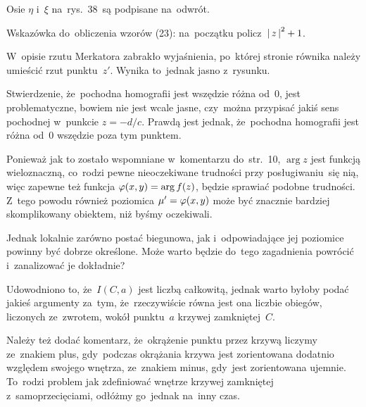 \documentclass[a4paper,11pt]{article}
\begin{document}
\vspace{\spaceFour}


\start {} Osie $\eta$ i~$\xi$ na~rys.~38~są podpisane na~odwrót.

\vspace{\spaceFour}


\start {} Wskazówka do~obliczenia wzorów (23): na~początku
policz~$\left| \,  z  \, \right|^{ 2 } + 1$.

\vspace{\spaceFour}


\start {} W~opisie rzutu Merkatora zabrakło wyjaśnienia,
po~której stronie równika należy umieścić rzut punktu~$z'$. Wynika
to~jednak jasno z~rysunku.

\vspace{\spaceFour}


\start {} Stwierdzenie, że~pochodna homografii jest wszędzie
różna od~0, jest problematyczne, bowiem nie jest wcale jasne,
czy~można przypisać jakiś sens pochodnej w~punkcie $z = -d / c$.
Prawdą jest jednak, że~pochodna homografii jest różna od~0 wszędzie
poza tym punktem.

\vspace{\spaceFour}


\start {} Ponieważ jak to zostało wspomniane w~komentarzu
do~str.~10, $\arg z$ jest funkcją wieloznaczną, co~rodzi pewne
nieoczekiwane trudności przy posługiwaniu~się nią, więc zapewne też
funkcja $\varphi( x, y ) = \arg f( z )$, będzie sprawiać podobne
trudności. Z~tego powodu również poziomica $\mu' = \varphi( x, y )$ może
być znacznie bardziej skomplikowany obiektem, niż byśmy oczekiwali.

Jednak lokalnie zarówno postać biegunowa, jak i~odpowiadające jej
poziomice powinny być dobrze określone. Może warto będzie do~tego
zagadnienia powrócić i~zanalizować je dokładnie?

\vspace{\spaceFour}


\start {} Udowodniono to, że~$I( C, a )$ jest liczbą
całkowitą, jednak warto byłoby podać jakieś argumenty za~tym,
że~rzeczywiście równa jest ona liczbie obiegów, liczonych ze~zwrotem,
wokół punktu~$a$ krzywej zamkniętej~$C$.

Należy też dodać komentarz, że~okrążenie punktu przez krzywą liczymy
ze~znakiem plus, gdy~podczas okrążania krzywa jest zorientowana
dodatnio względem swojego wnętrza, ze~znakiem minus, gdy~jest
zorientowana ujemnie. To~rodzi problem jak zdefiniować wnętrze krzywej
zamkniętej z~samoprzecięciami, odłóżmy go~jednak na~inny czas.
\end{document}
